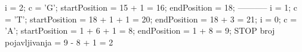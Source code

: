 i = 2; \newline
c = 'G'; \newline
startPosition = 15 + 1 = 16; \newline
endPosition = 18; \newline
----------- \newline
i = 1; \newline
c = 'T'; \newline
startPosition  = 18 + 1 + 1 = 20; \newline
endPosition = 18 + 3 = 21; \newline
 \newline
i = 0; \newline
c = 'A'; \newline
startPosition  = 1 + 6 + 1 = 8; \newline
endPosition = 1 + 8 = 9; \newline
 \newline
STOP \newline
 \newline
broj pojavljivanja = 9 - 8 + 1 = 2  \newline
\\


